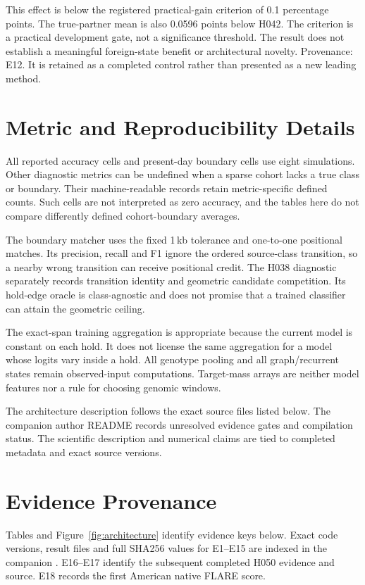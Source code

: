 \documentclass[letterpaper]{article}
\begin{document}
This effect is below the registered practical-gain criterion of 0.1 percentage points. The true-partner mean is also 0.0596 points below H042. The criterion is a practical development gate, not a significance threshold. The result does not establish a meaningful foreign-state benefit or architectural novelty. Provenance: E12. It is retained as a completed control rather than presented as a new leading method.

\section{Metric and Reproducibility Details}
All reported accuracy cells and present-day boundary cells use eight simulations. Other diagnostic metrics can be undefined when a sparse cohort lacks a true class or boundary. Their machine-readable records retain metric-specific defined counts. Such cells are not interpreted as zero accuracy, and the tables here do not compare differently defined cohort-boundary averages.

The boundary matcher uses the fixed 1\,kb tolerance and one-to-one positional matches. Its precision, recall and F1 ignore the ordered source-class transition, so a nearby wrong transition can receive positional credit. The H038 diagnostic separately records transition identity and geometric candidate competition. Its hold-edge oracle is class-agnostic and does not promise that a trained classifier can attain the geometric ceiling.

The exact-span training aggregation is appropriate because the current model is constant on each hold. It does not license the same aggregation for a model whose logits vary inside a hold. All genotype pooling and all graph/recurrent states remain observed-input computations. Target-mass arrays are neither model features nor a rule for choosing genomic windows.

The architecture description follows the exact source files listed below. The companion author README records unresolved evidence gates and compilation status. The scientific description and numerical claims are tied to completed metadata and exact source versions.

\section{Evidence Provenance}
\label{app:provenance}
Tables and Figure~\ref{fig:architecture} identify evidence keys below. Exact code versions, result files and full SHA256 values for E1--E15 are indexed in the companion . E16--E17 identify the subsequent completed H050 evidence and source. E18 records the first American native FLARE score.
\end{document}
